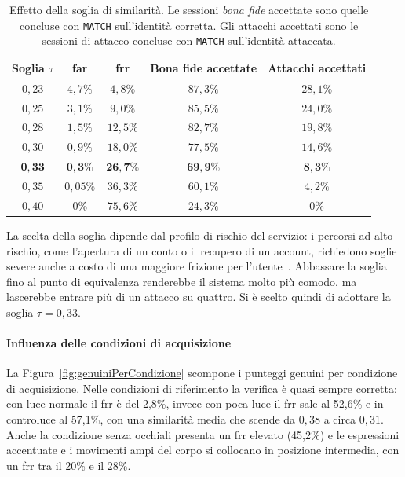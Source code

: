 \begin{table}[htbp]
    \centering
    \footnotesize
    \renewcommand{\arraystretch}{1.25}
    \begin{tabular*}{\textwidth}{@{\extracolsep{\fill}}ccccc@{}}
        \hline
        \textbf{Soglia $\tau$} & \textbf{\gls{far}} & \textbf{\gls{frr}} & \textbf{Bona fide accettate} & \textbf{Attacchi accettati} \\
        \hline
        $0{,}23$ & $4{,}7\%$ & $4{,}8\%$ & $87{,}3\%$ & $28{,}1\%$ \\
        $0{,}25$ & $3{,}1\%$ & $9{,}0\%$ & $85{,}5\%$ & $24{,}0\%$ \\
        $0{,}28$ & $1{,}5\%$ & $12{,}5\%$ & $82{,}7\%$ & $19{,}8\%$ \\
        $0{,}30$ & $0{,}9\%$ & $18{,}0\%$ & $77{,}5\%$ & $14{,}6\%$ \\
        $\mathbf{0{,}33}$ & $\mathbf{0{,}3\%}$ & $\mathbf{26{,}7\%}$ & $\mathbf{69{,}9\%}$ & $\mathbf{8{,}3\%}$ \\
        $0{,}35$ & $0{,}05\%$ & $36{,}3\%$ & $60{,}1\%$ & $4{,}2\%$ \\
        $0{,}40$ & $0\%$ & $75{,}6\%$ & $24{,}3\%$ & $0\%$ \\
        \hline
    \end{tabular*}
    \caption[Effetto della soglia di similarità]{Effetto della soglia di similarità. Le sessioni \textit{bona fide} accettate sono quelle concluse con \texttt{MATCH} sull'identità corretta. Gli attacchi accettati sono le sessioni di attacco concluse con \texttt{MATCH} sull'identità attaccata.}
    \label{tab:sogliaSimilarita}
\end{table}
La scelta della soglia dipende dal profilo di rischio del servizio: i percorsi ad alto rischio, come l'apertura di un conto o il recupero di un account, richiedono soglie severe anche a costo di una maggiore frizione per l'utente~\cite{groupBiometricLivenessPresentation}.
Abbassare la soglia fino al punto di equivalenza renderebbe il sistema molto più comodo, ma lascerebbe entrare più di un attacco su quattro.
Si è scelto quindi di adottare la soglia $\tau = 0{,}33$.

\paragraph{Influenza delle condizioni di acquisizione}
La Figura~\ref{fig:genuiniPerCondizione} scompone i punteggi genuini per condizione di acquisizione.
Nelle condizioni di riferimento la verifica è quasi sempre corretta: con luce normale il \gls{frr} è del 2,8\%, invece con poca luce il \gls{frr} sale al 52,6\% e in controluce al 57,1\%, con una similarità media che scende da $0{,}38$ a circa $0{,}31$.
Anche la condizione senza occhiali presenta un \gls{frr} elevato (45,2\%) e le espressioni accentuate e i movimenti ampi del corpo si collocano in posizione intermedia, con un \gls{frr} tra il 20\% e il 28\%.

